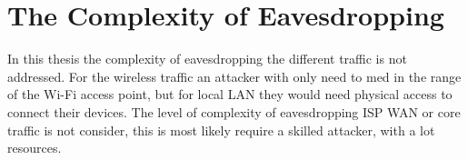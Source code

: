 \section{The Complexity of Eavesdropping}
In this thesis the complexity of eavesdropping the different traffic is not addressed. For the wireless traffic an attacker with only need to med in the range of the Wi-Fi access point, but for local LAN they would need physical access to connect their devices. The level of complexity of eavesdropping ISP WAN or core traffic is not consider, this is most likely require a skilled attacker, with a lot resources. 